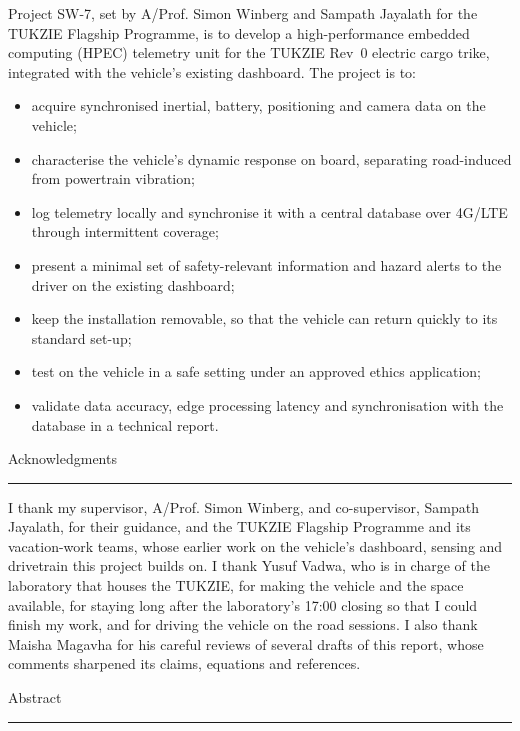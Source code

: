 \documentclass[a4paper,11pt]{report}
\begin{document}
{Project SW-7, set by A/Prof. Simon Winberg and Sampath Jayalath for the TUKZIE Flagship Programme, is to develop a high-performance embedded computing (HPEC) telemetry unit for the TUKZIE Rev~0 electric cargo trike, integrated with the vehicle's existing dashboard. The project is to:
\begin{itemize}
\item acquire synchronised inertial, battery, positioning and camera data on the vehicle;
\item characterise the vehicle's dynamic response on board, separating road-induced from powertrain vibration;
\item log telemetry locally and synchronise it with a central database over 4G/LTE through intermittent coverage;
\item present a minimal set of safety-relevant information and hazard alerts to the driver on the existing dashboard;
\item keep the installation removable, so that the vehicle can return quickly to its standard set-up;
\item test on the vehicle in a safe setting under an approved ethics application;
\item validate data accuracy, edge processing latency and synchronisation with the database in a technical report.
\end{itemize}


\fancyfoot[C]{\thepage}
\pagestyle{plain}
\newpage
{}
{\Large Acknowledgments}\\
\hrule
I thank my supervisor, A/Prof. Simon Winberg, and co-supervisor, Sampath Jayalath, for their guidance, and the TUKZIE Flagship Programme and its vacation-work teams, whose earlier work on the vehicle's dashboard, sensing and drivetrain this project builds on. I thank Yusuf Vadwa, who is in charge of the laboratory that houses the TUKZIE, for making the vehicle and the space available, for staying long after the laboratory's 17:00 closing so that I could finish my work, and for driving the vehicle on the road sessions. I also thank Maisha Magavha for his careful reviews of several drafts of this report, whose comments sharpened its claims, equations and references.


\newpage

{\Large Abstract}\\
\hrule

}
\end{document}
